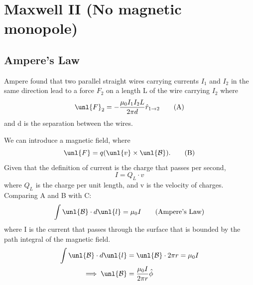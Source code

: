 \documentclass[a4paper, 11pt, normalem]{report}
\newcommand\B{\mathcal{B}}
\newcommand\uB{\unl{\B}}
\newcommand\hr{\hat{r}}
\begin{document}
\section{Maxwell \RN{2} (No magnetic monopole)}
\subsection{Ampere's Law}
Ampere found that two parallel straight wires carrying currents $I_1$ and $I_2$ in the same direction lead to a force $F_2$ on a length L of the wire carrying $I_2$ where
\begin{equation}
    \unl{F}_2 = -\frac{\mu_0 I_1 I_2 L}{2\pi d}\hr_{1\to2} \tag{A}
\end{equation}
and d is the separation between the wires.

We can introduce a magnetic field, where
\begin{equation}
    \unl{F} = q(\unl{v}\times\uB). \tag{B}
\end{equation}
Given that the definition of current is the charge that passes per second,
\begin{equation}
    I = Q_L\cdot v \tag{C}
\end{equation}
where $Q_L$ is the charge per unit length, and v is the velocity of charges. \\
Comparing A and B with C:
\begin{equation}
    \int \uB \cdot d\unl{l} = \mu_0 I \tag{Ampere's Law}
\end{equation}
where I is the current that passes through the surface that is bounded by the path integral of the magnetic field.
\begin{align}
    \int \uB\cdot d\unl{l} &= \uB\cdot2\pi r = \mu_0 I \\
    \implies \uB &= \frac{\mu_0 I}{2\pi r}\hat{\phi} \\
\end{align}
\end{document}
